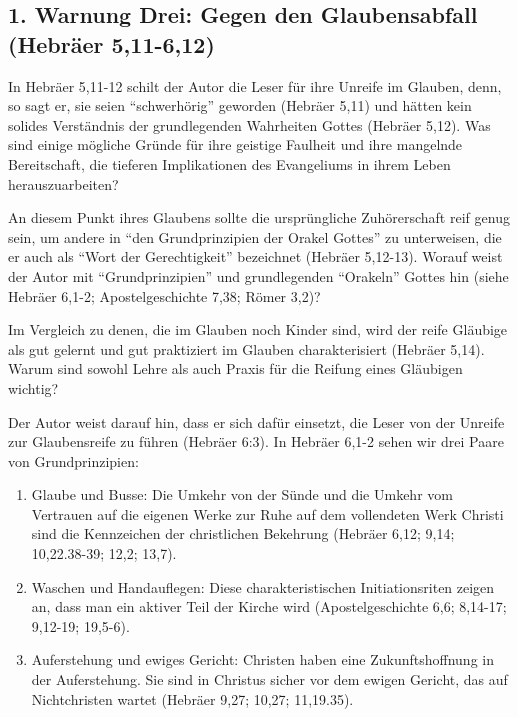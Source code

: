 \documentclass[headsepline=true]{book}
\providecommand{\tightlist}{%
  \setlength{\itemsep}{0pt}\setlength{\parskip}{0pt}}
\begin{document}
\subsection{1. Warnung Drei: Gegen den Glaubensabfall (Hebräer
5,11-6,12)}\label{warnung-drei-gegen-den-glaubensabfall-hebruxe4er-511-612}

In Hebräer 5,11-12 schilt der Autor die Leser für ihre Unreife im
Glauben, denn, so sagt er, sie seien ``schwerhörig'' geworden (Hebräer
5,11) und hätten kein solides Verständnis der grundlegenden Wahrheiten
Gottes (Hebräer 5,12). Was sind einige mögliche Gründe für ihre geistige
Faulheit und ihre mangelnde Bereitschaft, die tieferen Implikationen des
Evangeliums in ihrem Leben herauszuarbeiten?

An diesem Punkt ihres Glaubens sollte die ursprüngliche Zuhörerschaft
reif genug sein, um andere in ``den Grundprinzipien der Orakel Gottes''
zu unterweisen, die er auch als ``Wort der Gerechtigkeit'' bezeichnet
(Hebräer 5,12-13). Worauf weist der Autor mit ``Grundprinzipien'' und
grundlegenden ``Orakeln'' Gottes hin (siehe Hebräer 6,1-2;
Apostelgeschichte 7,38; Römer 3,2)?

Im Vergleich zu denen, die im Glauben noch Kinder sind, wird der reife
Gläubige als gut gelernt und gut praktiziert im Glauben charakterisiert
(Hebräer 5,14). Warum sind sowohl Lehre als auch Praxis für die Reifung
eines Gläubigen wichtig?

Der Autor weist darauf hin, dass er sich dafür einsetzt, die Leser von
der Unreife zur Glaubensreife zu führen (Hebräer 6:3). In Hebräer 6,1-2
sehen wir drei Paare von Grundprinzipien:

\begin{enumerate}
\def\labelenumi{\arabic{enumi}.}
\tightlist
\item
  Glaube und Busse: Die Umkehr von der Sünde und die Umkehr vom
  Vertrauen auf die eigenen Werke zur Ruhe auf dem vollendeten Werk
  Christi sind die Kennzeichen der christlichen Bekehrung (Hebräer 6,12;
  9,14; 10,22.38-39; 12,2; 13,7).
\item
  Waschen und Handauflegen: Diese charakteristischen Initiationsriten
  zeigen an, dass man ein aktiver Teil der Kirche wird
  (Apostelgeschichte 6,6; 8,14-17; 9,12-19; 19,5-6).
\item
  Auferstehung und ewiges Gericht: Christen haben eine Zukunftshoffnung
  in der Auferstehung. Sie sind in Christus sicher vor dem ewigen
  Gericht, das auf Nichtchristen wartet (Hebräer 9,27; 10,27; 11,19.35).
\end{enumerate}
\end{document}
